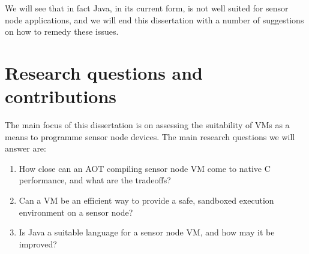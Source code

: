 We will see that in fact Java, in its current form, is not well suited for sensor node applications, and we will end this dissertation with a number of suggestions on how to remedy these issues.


\section{Research questions and contributions}
\label{sec-introduction-research-questions}
The main focus of this dissertation is on assessing the suitability of VMs as a means to programme sensor node devices. The main research questions we will answer are:
\begin{enumerate}
    \item How close can an AOT compiling sensor node VM come to native C performance, and what are the tradeoffs?
    \item Can a VM be an efficient way to provide a safe, sandboxed execution environment on a sensor node?
    \item Is Java a suitable language for a sensor node VM, and how may it be improved?
\end{enumerate}

